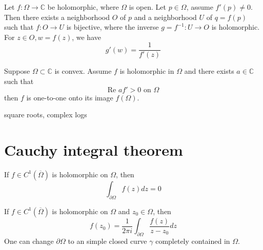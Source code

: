 \documentclass[openany]{book}
\newcommand{\R}{\mathbb{R}}
\newcommand{\C}{\mathbb{C}}
\begin{document}


\begin{thm}
    Let $f:\Omega\to\C$ be holomorphic, where $\Omega$ is open. Let $p\in\Omega$, assume $f'(p)\neq 0$. Then there exists a neighborhood $O$ of $p$ and a neighborhood $U$ of $q=f(p)$ such that $f:O\to U$ is bijective, where the inverse $g=f^{-1}: U\to O$ is holomorphic. For $z\in O, w=f(z)$, we have 
    \begin{equation*}
        g'(w)=\frac{1}{f'(z)}
    \end{equation*}
\end{thm}


\begin{prop}
    Suppose $\Omega\subset\C$ is convex. Assume $f$ is holomorphic in $\Omega$ and there exists $a\in\C$ such that 
    \begin{equation*}
        \text{Re } af'>0 \text{ on } \Omega
    \end{equation*}
    then $f$ is one-to-one onto its image $f(\Omega)$.
\end{prop}


\begin{defn}
    square roots, complex logs
\end{defn}


\chapter{Cauchy integral theorem}

\begin{thm}
    If $f\in C^1(\overline{\Omega})$ is holomorphic on $\Omega$, then 
    \begin{equation*}
        \int_{\partial\Omega}f(z)dz=0
    \end{equation*}
\end{thm}

\begin{thm}
    If $f\in C^1(\overline{\Omega})$ is holomorphic on $\Omega$ and $z_0\in\Omega$, then 
    \begin{equation*}
        f(z_0)=\frac{1}{2\pi i}\int_{\partial\Omega}\frac{f(z)}{z-z_0}dz
    \end{equation*}
    One can change $\partial\Omega$ to an simple closed curve $\gamma$ completely contained in $\Omega$.
\end{thm}
\end{document}
